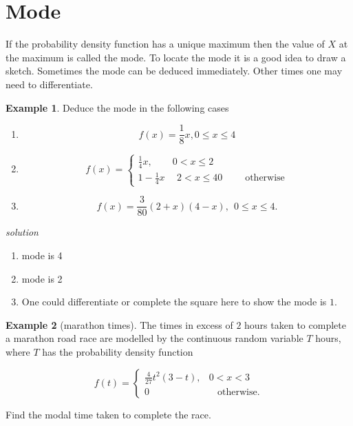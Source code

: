 \documentclass[
]{book}
\theoremstyle{definition}
\theoremstyle{definition}
\newtheorem{example}{Example}[chapter]
\theoremstyle{definition}
\theoremstyle{definition}
\theoremstyle{remark}
\begin{document}
\hypertarget{mode}{%
\section{Mode}\label{mode}}

If the probability density function has a unique maximum then the value of \(X\) at the maximum is called the mode. To locate the mode it is a good idea to draw a sketch. Sometimes the mode can be deduced immediately. Other times one may need to differentiate.

\begin{example}

Deduce the mode in the following cases

\begin{enumerate}
\def\labelenumi{\alph{enumi})}
\item
  \[f(x) = \frac{1}{8}x , 0\leq x \leq 4\]
\item
  \begin{equation*}
    f(x)=\begin{cases}
   \frac{1}{4}x, &  0< x \leq 2 \\
   1-\frac{1}{4}x & \ \  2< x \leq 4
   0& \ \ \ \ \  \ \ \text{otherwise}
    \end{cases}
  \end{equation*}
\item
  \[f(x) = \frac{3}{80}(2+x)(4-x) , \ \  0\leq x \leq 4.\]
\end{enumerate}

\emph{solution}

\begin{enumerate}
\def\labelenumi{\alph{enumi})}
\item
  mode is 4
\item
  mode is 2
\item
  One could differentiate or complete the square here to show the mode is \(1\).
\end{enumerate}

\end{example}

\begin{example}[marathon times]
The times in excess of \(2\) hours taken to complete a marathon road race are modelled by the continuous random variable \(T\) hours, where \(T\) has the probability density function

\begin{equation*}
  f(t)=\begin{cases}
    \frac{4}{27}t^2(3-t), &  0< x < 3\\
    0 & \ \ \ \  \text{otherwise}.
  \end{cases}
\end{equation*}

Find the modal time taken to complete the race.
\end{example}
\end{document}
